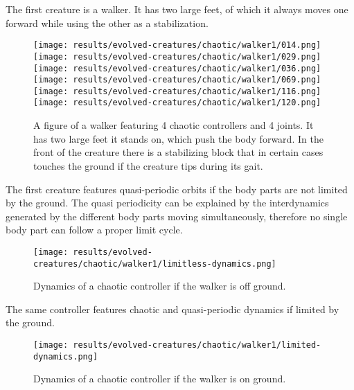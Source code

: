 \documentclass[main]{subfiles}
\begin{document}
The first creature is a walker. It has two large feet, of which it always moves one forward while using the other as a stabilization. 

\begin{figure}[H]
\centering
\texttt{[image: results/evolved-creatures/chaotic/walker1/014.png]}
\texttt{[image: results/evolved-creatures/chaotic/walker1/029.png]}
\texttt{[image: results/evolved-creatures/chaotic/walker1/036.png]}
\texttt{[image: results/evolved-creatures/chaotic/walker1/069.png]}
\texttt{[image: results/evolved-creatures/chaotic/walker1/116.png]}
\texttt{[image: results/evolved-creatures/chaotic/walker1/120.png]}
\caption[Figure of a walker using chaotic controllers.]{A figure of a walker featuring 4 chaotic controllers and 4 joints. It has two large feet it stands on, which push the body forward. In the front of the creature there is a stabilizing block that in certain cases touches the ground if the creature tips during its gait.}
\label{figure:successfulcreatures-chaotic-walker1}
\end{figure}

The first creature features quasi-periodic orbits if the body parts are not limited by the ground. %
%
The quasi periodicity can be explained by the interdynamics generated by the different body parts moving simultaneously, therefore no single body part can follow a proper limit cycle. %

\begin{figure}[H]
\centering
\texttt{[image: results/evolved-creatures/chaotic/walker1/limitless-dynamics.png]}
\caption[Off ground controller dynamics of the walker]{Dynamics of a chaotic controller if the walker is off ground.}
\label{figure:walker1-off-ground-controller-dynamics}
\end{figure}

The same controller features chaotic and quasi-periodic dynamics if limited by the ground. %

\begin{figure}[H]
\centering
\texttt{[image: results/evolved-creatures/chaotic/walker1/limited-dynamics.png]}
\caption[On ground controller dynamics of the walker]{Dynamics of a chaotic controller if the walker is on ground.}
\label{figure:walker1-on-ground-controller-dynamics}
\end{figure}
\end{document}

